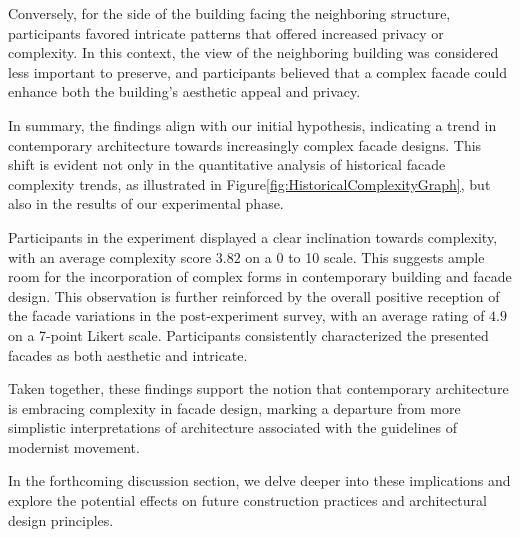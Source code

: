 Conversely, for the side of the building facing the neighboring structure, participants favored intricate patterns that offered increased privacy or complexity.
In this context, the view of the neighboring building was considered less important to preserve, and participants believed that a complex facade could enhance both the building's aesthetic appeal and privacy.


In summary, the findings align with our initial hypothesis, indicating a trend in contemporary architecture towards increasingly complex facade designs.
This shift is evident not only in the quantitative analysis of historical facade complexity trends, as illustrated in Figure\ref{fig:HistoricalComplexityGraph}, but also in the results of our experimental phase.

Participants in the experiment displayed a clear inclination towards complexity, with an average complexity score \(3.82\) on a 0 to 10 scale.
This suggests ample room for the incorporation of complex forms in contemporary building and facade design.
This observation is further reinforced by the overall positive reception of the facade variations in the post-experiment survey, with an average rating of \(4.9\) on a 7-point Likert scale.
Participants consistently characterized the presented facades as both aesthetic and intricate.

Taken together, these findings support the notion that contemporary architecture is embracing complexity in facade design, marking a departure from more simplistic interpretations of architecture associated with the guidelines of modernist movement.

In the forthcoming discussion section, we delve deeper into these implications and explore the potential effects on future construction practices and architectural design principles.


